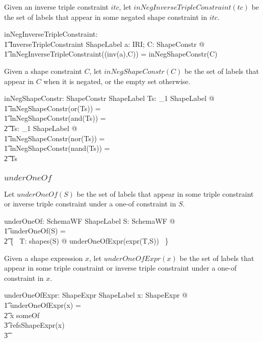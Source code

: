 \documentclass{article}
\begin{document}
Given an inverse triple constraint $itc$, let $inNegInverseTripleConstraint(tc)$ be the set of labels that appear in some negated shape constraint in $itc$.
\begin{axdef}
	inNegInverseTripleConstraint: \\
\t1		InverseTripleConstraint \fun \finset ShapeLabel
\where
	\forall a: IRI; C: ShapeConstr @ \\
\t1		inNegInverseTripleConstraint((inv(a),C)) = inNegShapeConstr(C)
\end{axdef}

Given a shape constraint $C$, let $inNegShapeConstr(C)$ be the set of labels that appear in $C$ when it is negated, or the
empty set otherwise.
\begin{axdef}
	inNegShapeConstr: ShapeConstr \fun \finset ShapeLabel
\where
	\forall Ts: \seq_1 ShapeLabel @ \\
\t1		inNegShapeConstr(or(Ts)) = \\
\t1		inNegShapeConstr(and(Ts)) = \\
\t2			\emptyset
\also
	\forall Ts: \seq_1 ShapeLabel @ \\
\t1		inNegShapeConstr(nor(Ts)) = \\
\t1		inNegShapeConstr(nand(Ts)) = \\
\t2			\ran Ts
\end{axdef}

\subsubsection{$underOneOf$}
Let $underOneOf(S)$ be the set of labels that appear in some triple constraint or inverse triple constraint under a one-of constraint
in $S$.
\begin{axdef}
	underOneOf: SchemaWF \fun \finset ShapeLabel
\where
	\forall S: SchemaWF @ \\
\t1		underOneOf(S) = \\
\t2		\bigcup \{~ T: shapes(S) @ underOneOfExpr(expr(T,S)) ~\}
\end{axdef}

Given a shape expression $x$, let $underOneOfExpr(x)$ be the set of labels that appear in some triple constraint or inverse triple constraint under a one-of constraint in $x$.
\begin{axdef}
	underOneOfExpr: ShapeExpr \fun \finset ShapeLabel
\where
	\forall x: ShapeExpr @ \\
\t1		underOneOfExpr(x) = \\
\t2			\IF x \in \ran someOf \\
\t3				\THEN refsShapeExpr(x) \\
\t3				\ELSE \emptyset
\end{axdef}
\end{document}
